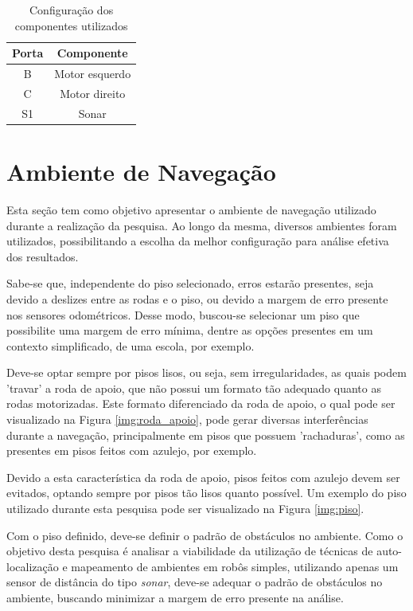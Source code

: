 	\begin{table}[H]
		\centering
		\caption{Configuração dos componentes utilizados}
		\label{tab:portas_motores_sensores}
		\begin{tabular}{|c|c|}
		\hline
		\textbf{Porta} & \textbf{Componente} \\ \hline
		B              & Motor esquerdo      \\ \hline
		C              & Motor direito       \\ \hline
		S1             & Sonar               \\ \hline
		\end{tabular}
	\end{table}

\section{Ambiente de Navegação}

	Esta seção tem como objetivo apresentar o ambiente de navegação utilizado durante a realização da pesquisa. Ao longo da mesma, diversos ambientes foram utilizados, possibilitando a escolha da melhor configuração para análise efetiva dos resultados.

	Sabe-se que, independente do piso selecionado, erros estarão presentes, seja devido a deslizes entre as rodas e o piso, ou devido a margem de erro presente nos sensores odométricos. Desse modo, buscou-se selecionar um piso que possibilite uma margem de erro mínima, dentre as opções presentes em um contexto simplificado, de uma escola, por exemplo.

	Deve-se optar sempre por pisos lisos, ou seja, sem irregularidades, as quais podem 'travar' a roda de apoio, que não possui um formato tão adequado quanto as rodas motorizadas. Este formato diferenciado da roda de apoio, o qual pode ser visualizado na Figura \ref{img:roda_apoio}, pode gerar diversas interferências durante a navegação, principalmente em pisos que possuem 'rachaduras', como as presentes em pisos feitos com azulejo, por exemplo.

	Devido a esta característica da roda de apoio, pisos feitos com azulejo devem ser evitados, optando sempre por pisos tão lisos quanto possível. Um exemplo do piso utilizado durante esta pesquisa pode ser visualizado na Figura \ref{img:piso}.

	Com o piso definido, deve-se definir o padrão de obstáculos no ambiente. Como o objetivo desta pesquisa é analisar a viabilidade da utilização de técnicas de auto-localização e mapeamento de ambientes em robôs simples, utilizando apenas um sensor de distância do tipo \textit{sonar}, deve-se adequar o padrão de obstáculos no ambiente, buscando minimizar a margem de erro presente na análise.

